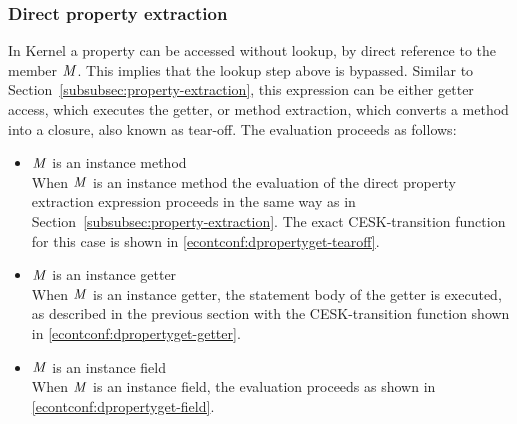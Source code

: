 \documentclass{article}
\begin{document}
\subsubsection{Direct property extraction}
\label{subsubsec:direct-property-extraction}
In Kernel a property can be accessed without lookup, by direct reference to the member $\mathit{M}$.
This implies that the lookup step above is bypassed.
Similar to Section~\ref{subsubsec:property-extraction}, this expression can be either getter access, which executes the getter, or method extraction, which converts a method into a closure, also known as tear-off.
The evaluation proceeds as follows:
\begin{itemize}
\item $\mathit{M}$ is an instance method\\
When $\mathit{M}$ is an instance method the evaluation of the direct property extraction expression proceeds in the same way as in Section~\ref{subsubsec:property-extraction}.
The exact CESK-transition function for this case is shown in \eqref{econtconf:dpropertyget-tearoff}.
\item $\mathit{M}$ is an instance getter\\
When $\mathit{M}$ is an instance getter, the statement body of the getter is executed, as described in the previous section with the CESK-transition function shown in \eqref{econtconf:dpropertyget-getter}.
\item $\mathit{M}$ is an instance field\\
When $\mathit{M}$ is an instance field, the evaluation proceeds as shown in \eqref{econtconf:dpropertyget-field}.
\end{itemize}
\end{document}
